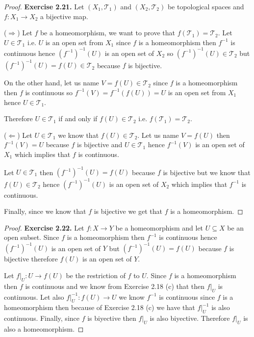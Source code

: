 \documentclass[11pt]{article}
\newcommand{\Topo}{\mathcal{T}}
\theoremstyle{definition}
\begin{document}
\begin{proof}{\textbf{Exercise 2.21.}}
    Let $(X_1, \Topo_1)$ and $(X_2, \Topo_2)$ be topological spaces and $f:X_1 \to X_2$
    a bijective map.

    ($\Rightarrow$) Let $f$ be a homeomorphism, we want to prove that
    $f(\Topo_1) = \Topo_2$. Let $U \in \Topo_1$ i.e. $U$ is an open set from
    $X_1$ since $f$ is a homeomorphism then $f^{-1}$ is continuous hence
    $(f^{-1})^{-1}(U)$ is an open set of $X_2$ so $(f^{-1})^{-1}(U) \in \Topo_2$ 
    but $(f^{-1})^{-1}(U) = f(U) \in \Topo_2$ because $f$ is bijective.

    On the other hand, let us name $V = f(U) \in \Topo_2$ since $f$ is a
    homeomorphism then $f$ is continuous so $f^{-1}(V) = f^{-1}(f(U)) = U$ is
    an open set from $X_1$ hence $U \in \Topo_1$.
    
    Therefore $U \in \Topo_1$ if and only if $f(U) \in \Topo_2$ i.e.
    $f(\Topo_1) = \Topo_2$.

    ($\Leftarrow$) Let $U \in \Topo_1$ we know that $f(U) \in \Topo_2$. Let us
    name $V = f(U)$ then $f^{-1}(V) = U$ because $f$ is bijective and
    $U \in \Topo_1$ hence $f^{-1}(V)$ is an open set of $X_1$ which implies
    that $f$ is continuous.
    
    Let $U \in \Topo_1$ then $(f^{-1})^{-1}(U) = f(U)$ because $f$ is bijective
    but we know that $f(U) \in \Topo_2$ hence $(f^{-1})^{-1}(U)$ is an open set
    of $X_2$ which implies that $f^{-1}$ is continuous.

    Finally, since we know that $f$ is bijective we get that $f$ is a
    homeomorphism.
\end{proof}
\cleardoublepage
\begin{proof}{\textbf{Exercise 2.22.}}
    Let $f:X \to Y$ be a homeomorphism and let $U \subseteq X$ be an open
    subset. Since $f$ is a homeomorphism then $f^{-1}$ is continuous hence
    $(f^{-1})^{-1}(U)$ is an open set of $Y$ but $(f^{-1})^{-1}(U) = f(U)$
    because $f$ is bijective therefore $f(U)$ is an open set of $Y$.

    Let $f|_U: U \to f(U)$ be the restriction of $f$ to $U$. Since $f$ is a
    homeomorphism then $f$ is continuous and we know from Exercise 2.18 (c)
    that then $f|_U$ is continuous. Let also $f|_U^{-1}:f(U) \to U$ we know
    $f^{-1}$ is continuous since $f$ is a homeomorphism then because of
    Exercise 2.18 (c) we have that $f|_U^{-1}$ is also continuous.
    Finally, since $f$ is biyective then $f|_U$ is also biyective.
    Therefore $f|_U$ is also a homeomorphism.
\end{proof}
\end{document}
